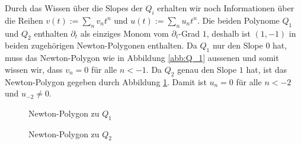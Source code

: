 Durch das Wissen über die Slopes der $Q_i$ erhalten wir noch Informationen über
die Reihen $v(t):=\sum_n v_nt^n$ und $u(t):=\sum_n u_nt^n$. Die beiden Polynome
$Q_1$ und $Q_2$ enthalten $\partial_t$ als einziges Monom vom $\partial_t$-Grad
$1$, deshalb ist $(1,-1)$ in beiden zugehörigen Newton-Polygonen enthalten.
Da $Q_1$ nur den Slope $0$ hat, muss das Newton-Polygon wie in Abbildung
\ref{abb:Q_1} aussenen und somit wissen wir, dass $v_n=0$ für alle $n<-1$.
Da $Q_2$ genau den Slope $1$ hat, ist das Newton-Polygon gegeben durch
Abbildung \ref{abb:Q_2}. Damit ist $u_n=0$ für alle $n<-2$ und $u_{-2}\neq0$.
\begin{figure}[htbp]
  \begin{minipage}[hbt]{0,49\textwidth}
  \begin{center}
  \end{center}
  \caption{Newton-Polygon zu $Q_1$}
  \label{abb:Q_1}
  \end{minipage}
  \begin{minipage}[hbt]{0,49\textwidth}
  \begin{center}
  \end{center}
  \caption{Newton-Polygon zu $Q_2$}
  \label{abb:Q_2}
  \end{minipage}
\end{figure}

